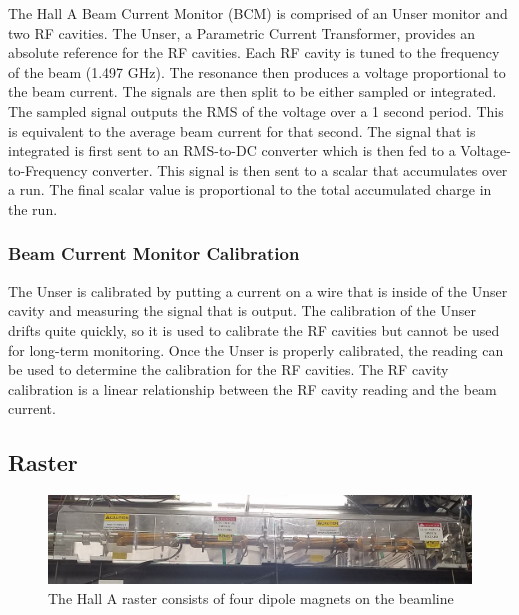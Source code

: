The Hall A Beam Current Monitor (BCM) is comprised of an Unser monitor and two RF cavities. The Unser, a Parametric Current Transformer, provides an absolute reference for the RF cavities. Each RF cavity is tuned to the frequency of the beam (1.497 GHz). The resonance then produces a voltage proportional to the beam current. The signals are then split to be either sampled or integrated. The sampled signal outputs the RMS of the voltage over a 1 second period. This is equivalent to the average beam current for that second. The signal that is integrated is first sent to an RMS-to-DC converter which is then fed to a Voltage-to-Frequency converter. This signal is then sent to a scalar that accumulates over a run. The final scalar value is proportional to the total accumulated charge in the run.

\subsubsection{Beam Current Monitor Calibration}

The Unser is calibrated by putting a current on a wire that is inside of the Unser cavity and measuring the signal that is output. The calibration of the Unser drifts quite quickly, so it is used to calibrate the RF cavities but cannot be used for long-term monitoring. Once the Unser is properly calibrated, the reading can be used to determine the calibration for the RF cavities. The RF cavity calibration is a linear relationship between the RF cavity reading and the beam current.

\subsection{Raster}

\begin{figure}[h]
\begin{center}
	\includegraphics[width=\textwidth]{./setup/fig/raster_pic.jpg}
	\caption{The Hall A raster consists of four dipole magnets on the beamline}
	\label{fig:rasterpic}
\end{center}
\end{figure}

